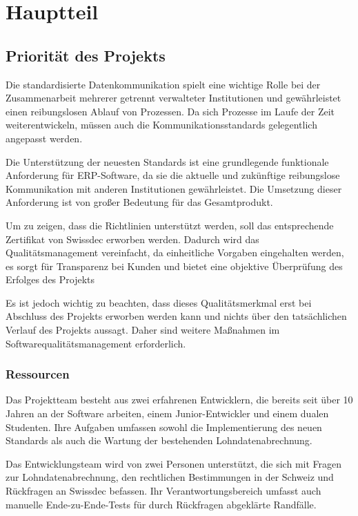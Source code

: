 \chapter{Hauptteil}

\section{Priorität des Projekts}


Die standardisierte Datenkommunikation spielt eine wichtige Rolle bei der Zusammenarbeit mehrerer getrennt verwalteter Institutionen und gewährleistet einen reibungslosen Ablauf von Prozessen. Da sich Prozesse im Laufe der Zeit weiterentwickeln, müssen auch die Kommunikationsstandards gelegentlich angepasst werden.

Die Unterstützung der neuesten Standards ist eine grundlegende funktionale Anforderung für ERP-Software, da sie die aktuelle und zukünftige reibungslose Kommunikation mit anderen Institutionen gewährleistet.
Die Umsetzung dieser Anforderung ist von großer Bedeutung für das Gesamtprodukt.

Um zu zeigen, dass die Richtlinien unterstützt werden, soll das entsprechende Zertifikat von Swissdec erworben werden. Dadurch wird das Qualitätsmanagement vereinfacht, da einheitliche Vorgaben eingehalten werden, es sorgt für Transparenz bei Kunden und bietet eine objektive Überprüfung des Erfolges des Projekts

Es ist jedoch wichtig zu beachten, dass dieses Qualitätsmerkmal erst bei Abschluss des Projekts erworben werden kann und nichts über den tatsächlichen Verlauf des Projekts aussagt. Daher sind weitere Maßnahmen im Softwarequalitätsmanagement erforderlich.

\subsection{Ressourcen}

Das Projektteam besteht aus zwei erfahrenen Entwicklern, die bereits seit über 10 Jahren an der Software arbeiten, einem Junior-Entwickler und einem dualen Studenten.  Ihre Aufgaben umfassen sowohl die Implementierung des neuen Standards als auch die Wartung der bestehenden Lohndatenabrechnung.

Das Entwicklungsteam wird von zwei Personen unterstützt, die sich mit Fragen zur Lohndatenabrechnung, den rechtlichen Bestimmungen in der Schweiz und Rückfragen an Swissdec befassen. Ihr Verantwortungsbereich umfasst auch manuelle Ende-zu-Ende-Tests für durch Rückfragen abgeklärte Randfälle.

